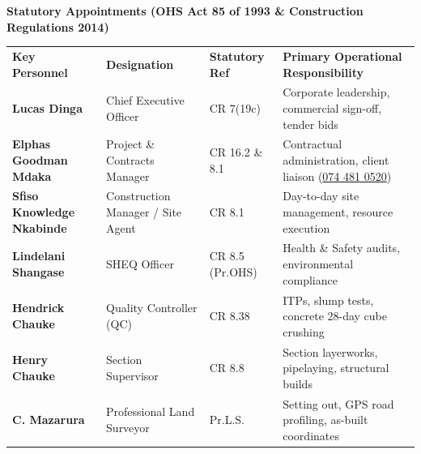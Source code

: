 \documentclass[a4paper,11pt]{article}
\begin{document}
\vspace{0.18cm}

{\large\bfseries\color{mhnavy} Statutory Appointments (OHS Act 85 of 1993 \& Construction Regulations 2014)}
\vspace{0.08cm}

\noindent
\renewcommand{\arraystretch}{1.18}
\begin{tabularx}{\textwidth}{@{}p{3.8cm} p{3.4cm} p{2.2cm} X@{}}
\rowcolor{mhnavy}
{\color{white}\bfseries\fontsize{8pt}{9.8pt}\selectfont Key Personnel} &
{\color{white}\bfseries\fontsize{8pt}{9.8pt}\selectfont Designation} &
{\color{white}\bfseries\fontsize{8pt}{9.8pt}\selectfont Statutory Ref} &
{\color{white}\bfseries\fontsize{8pt}{9.8pt}\selectfont Primary Operational Responsibility} \\
\rowcolor{mhbluelight}
\fontsize{7.6pt}{9.5pt}\selectfont\bfseries Lucas Dinga & \fontsize{7.6pt}{9.5pt}\selectfont Chief Executive Officer & \fontsize{7.6pt}{9.5pt}\selectfont CR 7(19c) & \fontsize{7.6pt}{9.5pt}\selectfont Corporate leadership, commercial sign-off, tender bids \\
\fontsize{7.6pt}{9.5pt}\selectfont\bfseries Elphas Goodman Mdaka & \fontsize{7.6pt}{9.5pt}\selectfont Project \& Contracts Manager & \fontsize{7.6pt}{9.5pt}\selectfont CR 16.2 \& 8.1 & \fontsize{7.6pt}{9.5pt}\selectfont Contractual administration, client liaison (\href{tel:0744810520}{074 481 0520}) \\
\rowcolor{mhbluelight}
\fontsize{7.6pt}{9.5pt}\selectfont\bfseries Sfiso Knowledge Nkabinde & \fontsize{7.6pt}{9.5pt}\selectfont Construction Manager / Site Agent & \fontsize{7.6pt}{9.5pt}\selectfont CR 8.1 & \fontsize{7.6pt}{9.5pt}\selectfont Day-to-day site management, resource execution \\
\fontsize{7.6pt}{9.5pt}\selectfont\bfseries Lindelani Shangase & \fontsize{7.6pt}{9.5pt}\selectfont SHEQ Officer & \fontsize{7.6pt}{9.5pt}\selectfont CR 8.5 (Pr.OHS) & \fontsize{7.6pt}{9.5pt}\selectfont Health \& Safety audits, environmental compliance \\
\rowcolor{mhbluelight}
\fontsize{7.6pt}{9.5pt}\selectfont\bfseries Hendrick Chauke & \fontsize{7.6pt}{9.5pt}\selectfont Quality Controller (QC) & \fontsize{7.6pt}{9.5pt}\selectfont CR 8.38 & \fontsize{7.6pt}{9.5pt}\selectfont ITPs, slump tests, concrete 28-day cube crushing \\
\fontsize{7.6pt}{9.5pt}\selectfont\bfseries Henry Chauke & \fontsize{7.6pt}{9.5pt}\selectfont Section Supervisor & \fontsize{7.6pt}{9.5pt}\selectfont CR 8.8 & \fontsize{7.6pt}{9.5pt}\selectfont Section layerworks, pipelaying, structural builds \\
\rowcolor{mhbluelight}
\fontsize{7.6pt}{9.5pt}\selectfont\bfseries C. Mazarura & \fontsize{7.6pt}{9.5pt}\selectfont Professional Land Surveyor & \fontsize{7.6pt}{9.5pt}\selectfont Pr.L.S. & \fontsize{7.6pt}{9.5pt}\selectfont Setting out, GPS road profiling, as-built coordinates \\
\end{tabularx}
\renewcommand{\arraystretch}{1}
\end{document}
